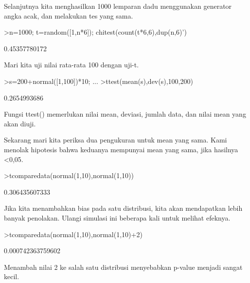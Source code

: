\documentclass[a4paper,10pt]{article}
\begin{document}
\begin{eulernotebook}
\begin{eulercomment}
\begin{eulercomment}
\begin{eulercomment}
Selanjutnya kita menghasilkan 1000 lemparan dadu menggunakan generator
angka acak, dan melakukan tes yang sama.
\end{eulercomment}
\begin{eulerprompt}
>n=1000; t=random([1,n*6]); chitest(count(t*6,6),dup(n,6)')
\end{eulerprompt}
\begin{euleroutput}
  0.45357780172
\end{euleroutput}
\begin{eulercomment}
Mari kita uji nilai rata-rata 100 dengan uji-t.
\end{eulercomment}
\begin{eulerprompt}
>s=200+normal([1,100])*10; ...
>ttest(mean(s),dev(s),100,200)
\end{eulerprompt}
\begin{euleroutput}
  0.2654993686
\end{euleroutput}
\begin{eulercomment}
Fungsi ttest() memerlukan nilai mean, deviasi, jumlah data, dan nilai
mean yang akan diuji.

Sekarang mari kita periksa dua pengukuran untuk mean yang sama. Kami
menolak hipotesis bahwa keduanya mempunyai mean yang sama, jika
hasilnya \textless{}0,05.
\end{eulercomment}
\begin{eulerprompt}
>tcomparedata(normal(1,10),normal(1,10))
\end{eulerprompt}
\begin{euleroutput}
  0.306435607333
\end{euleroutput}
\begin{eulercomment}
Jika kita menambahkan bias pada satu distribusi, kita akan mendapatkan
lebih banyak penolakan. Ulangi simulasi ini beberapa kali untuk
melihat efeknya.
\end{eulercomment}
\begin{eulerprompt}
>tcomparedata(normal(1,10),normal(1,10)+2)
\end{eulerprompt}
\begin{euleroutput}
  0.000742363759602
\end{euleroutput}
\begin{eulercomment}
Menambah nilai 2 ke salah satu distribusi menyebabkan p-value menjadi
sangat kecil.


\end{eulercomment}
\end{eulercomment}
\end{eulercomment}
\end{eulernotebook}
\end{document}

